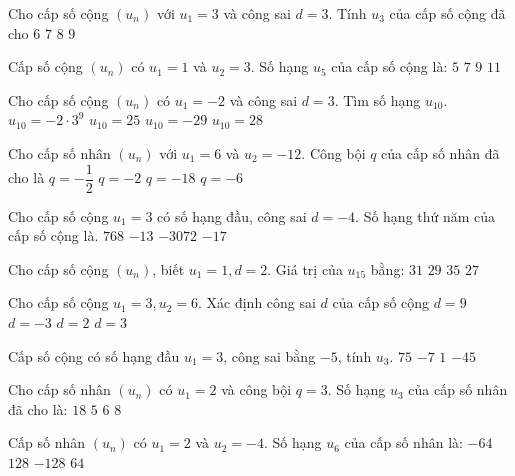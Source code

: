 \begin{ex}
Cho cấp số cộng $(u_n)$ với $u_1=3$ và công sai $d=3$. Tính $u_3$ của cấp số cộng đã cho
\choice
{$6$}
{$7$}
{$8$}
{\True $9$}
\end{ex}
\begin{ex}
Cấp số cộng $(u_n)$ có $u_1=1$ và $u_2=3$. Số hạng $u_5$ của cấp số cộng là:
\choice
{$5$}
{$7$}
{\True $9$}
{$11$}
\end{ex}
\begin{ex}
Cho cấp số cộng $(u_n)$ có $u_1=-2$ và công sai $d=3$. Tìm số hạng $u_{10}$.
\choice
{$u_{10}=-2 \cdot 3^9$}
{\True $u_{10}=25$}
{$u_{10}=-29$}
{$u_{10}=28$}
\end{ex}
\begin{ex}
Cho cấp số nhân $(u_n)$ với $u_1=6$ và $u_2=-12$. Công bội $q$ của cấp số nhân đã cho là
\choice
{$q=-\dfrac{1}{2}$}
{\True $q=-2$}
{$q=-18$}
{$q=-6$}
\end{ex}
\begin{ex}
Cho cấp số cộng $u_1=3$ có số hạng đầu, công sai $d=-4$. Số hạng thứ năm của cấp số cộng là.
\choice
{$768$}
{\True $-13$}
{$-3072$}
{$-17$}
\end{ex}
\begin{ex}
Cho cấp số cộng $(u_n)$, biết $u_1=1, d=2$. Giá trị của $u_{15}$ bằng:
\choice
{$31$}
{\True $29$}
{$35$}
{$27$}
\end{ex}
\begin{ex}
Cho cấp số cộng $u_1=3,u_2=6$. Xác định công sai $d$ của cấp số cộng
\choice
{$d=9$}
{$d=-3$}
{\True $d=2$}
{$d=3$}
\end{ex}
\begin{ex}
Cấp số cộng có số hạng đầu $u_1=3$, công sai bằng $-5$, tính $u_3$. 
\choice
{$75$}
{\True $-7$}
{$1$}
{$-45$}
\end{ex}
\begin{ex}
Cho cấp số nhân $(u_n)$ có $u_1=2$ và công bội $q=3$. Số hạng $u_3$ của cấp số nhân đã cho là:
\choice
{\True $18$}
{$5$}
{$6$}
{$8$}
\end{ex}
\begin{ex}
Cấp số nhân $(u_n)$ có $u_1=2$ và $u_2=-4$. Số hạng $u_6$ của cấp số nhân là:
\choice
{\True $-64$}
{$128$}
{$-128$}
{$64$}
\end{ex}
